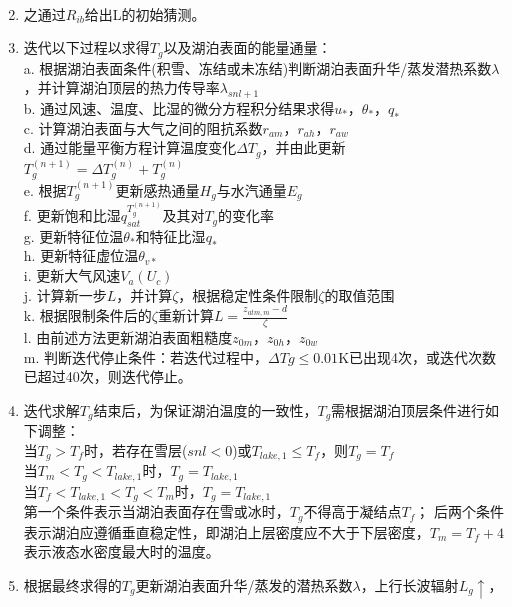 \begin{enumerate}
\begin{equation}
\begin{array}{cc}
            \end{array}
        \end{equation}
    \item 之通过$R_{ib}$给出L的初始猜测。
    \item 迭代以下过程以求得$T_g$以及湖泊表面的能量通量：\\
    a. 根据湖泊表面条件(积雪、冻结或未冻结)判断湖泊表面升华/蒸发潜热系数$\lambda$，并计算湖泊顶层的热力传导率$\lambda_{snl+1}$ \\
    b. 通过风速、温度、比湿的微分方程积分结果求得$u_\ast$，$\theta_\ast$，$q_\ast$ \\
    c. 计算湖泊表面与大气之间的阻抗系数$r_{am}$，$r_{ah}$，$r_{aw}$ \\
    d. 通过能量平衡方程计算温度变化$\Delta T_g$，并由此更新$T_g^{\left(n+1\right)}=\Delta T_g^{\left(n\right)}+T_g^{\left(n\right)}$ \\
    e. 根据$T_g^{\left(n+1\right)}$更新感热通量$H_g$与水汽通量$E_g$ \\
    f. 更新饱和比湿$q_{sat}^{T_g^{\left(n+1\right)}}$及其对$T_g$的变化率 \\
    g. 更新特征位温$\theta_\ast$和特征比湿$q_\ast$ \\
    h. 更新特征虚位温$\theta_{v\ast}$ \\
    i. 更新大气风速$V_a\left(U_c\right)$ \\
    j. 计算新一步$L$，并计算$\zeta$，根据稳定性条件限制$\zeta$的取值范围 \\
    k. 根据限制条件后的$\zeta$重新计算$L=\frac{z_{atm,m}-d}{\zeta}$ \\
    l. 由前述方法更新湖泊表面粗糙度$z_{0m}$，$z_{0h}$，$z_{0w}$\\
    m. 判断迭代停止条件：若迭代过程中，$\Delta Tg\leq 0.01$K已出现4次，或迭代次数已超过40次，则迭代停止。
    \item 迭代求解$T_g$结束后，为保证湖泊温度的一致性，$T_g$需根据湖泊顶层条件进行如下调整：\\
    当$T_g>T_f$时，若存在雪层($snl<0$)或$T_{lake,1}\le T_f$，则$T_g=T_f$ \\
    当$T_m<T_g<T_{lake,1}$时，$T_g=T_{lake,1}$ \\
    当$T_f<T_{lake,1}<T_g<T_m$时，$T_g=T_{lake,1}$ \\
    第一个条件表示当湖泊表面存在雪或冰时，$T_g$不得高于凝结点$T_f$；
    后两个条件表示湖泊应遵循垂直稳定性，即湖泊上层密度应不大于下层密度，$T_m=T_f+4$表示液态水密度最大时的温度。
    \item 根据最终求得的$T_g$更新湖泊表面升华/蒸发的潜热系数$\lambda$，上行长波辐射$L_g\uparrow$，

\end{enumerate}
